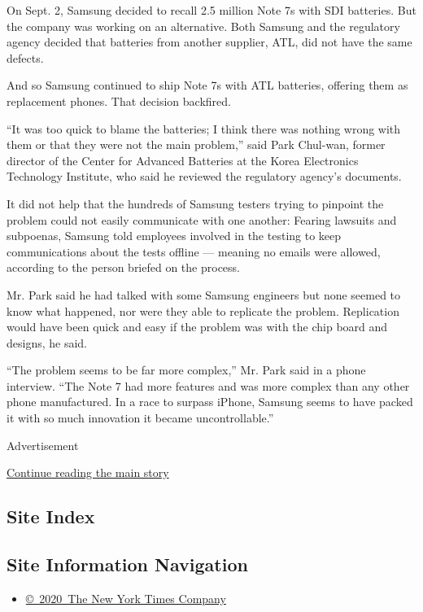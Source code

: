On Sept. 2, Samsung decided to recall 2.5 million Note 7s with SDI
batteries. But the company was working on an alternative. Both Samsung
and the regulatory agency decided that batteries from another supplier,
ATL, did not have the same defects.

And so Samsung continued to ship Note 7s with ATL batteries, offering
them as replacement phones. That decision backfired.

``It was too quick to blame the batteries; I think there was nothing
wrong with them or that they were not the main problem,'' said Park
Chul-wan, former director of the Center for Advanced Batteries at the
Korea Electronics Technology Institute, who said he reviewed the
regulatory agency's documents.

It did not help that the hundreds of Samsung testers trying to pinpoint
the problem could not easily communicate with one another: Fearing
lawsuits and subpoenas, Samsung told employees involved in the testing
to keep communications about the tests offline --- meaning no emails
were allowed, according to the person briefed on the process.

Mr. Park said he had talked with some Samsung engineers but none seemed
to know what happened, nor were they able to replicate the problem.
Replication would have been quick and easy if the problem was with the
chip board and designs, he said.

``The problem seems to be far more complex,'' Mr. Park said in a phone
interview. ``The Note 7 had more features and was more complex than any
other phone manufactured. In a race to surpass iPhone, Samsung seems to
have packed it with so much innovation it became uncontrollable.''

Advertisement

\protect\hyperlink{after-bottom}{Continue reading the main story}

\hypertarget{site-index}{%
\subsection{Site Index}\label{site-index}}

\hypertarget{site-information-navigation}{%
\subsection{Site Information
Navigation}\label{site-information-navigation}}

\begin{itemize}
\tightlist
\item
  \href{https://help.nytimes3xbfgragh.onion/hc/en-us/articles/115014792127-Copyright-notice}{©~2020~The
  New York Times Company}
\end{itemize}

